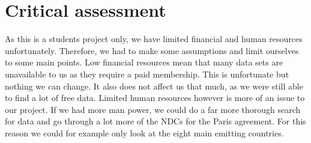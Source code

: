 \section*{Critical assessment}


As this is a students project only, we have limited financial and human resources unfortunately. Therefore, we had to make some assumptions and limit ourselves to some main points.
Low financial resources mean that many data sets are unavailable to us as they require a paid membership. This is unfortunate but nothing we can change. It also does not affect us that much, as we were still able to find a lot of free data. 
Limited human resources however is more of an issue to our project. If we had more man power, we could do a far more thorough search for data and go through a lot more of the NDCs for the Paris agreement. For this reason we could for example only look at the eight main \co emitting countries.


\newpage



























